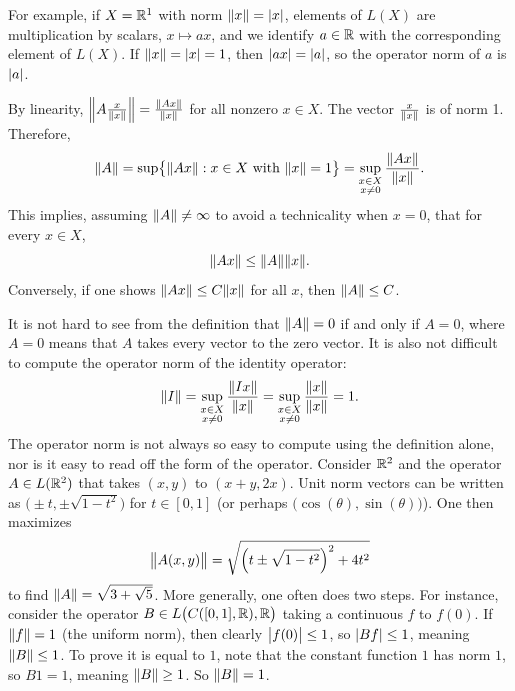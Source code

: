 For example, if $X={\mathbb{R}}^1$ with norm $\lVert {x} \rVert=\lvert {x} \rvert$, elements of $L(X)$
are multiplication by scalars, $x \mapsto ax$, and we identify $a \in {\mathbb{R}}$ with the
corresponding element of $L(X)$.  If $\lVert {x} \rVert=\lvert {x} \rvert=1$, then $\lvert {a x} \rvert = \lvert {a} \rvert$, so
the operator norm of $a$ is $\lvert {a} \rvert$.

By linearity,
$\left\lVert {A \frac{x}{\lVert {x} \rVert}} \right\rVert = \frac{\lVert {Ax} \rVert}{\lVert {x} \rVert}$
for all nonzero $x \in X$.
The vector $\frac{x}{\lVert {x} \rVert}$ is of norm 1.
Therefore,
\begin{equation*}
\lVert {A} \rVert =
\sup \bigl\{ \lVert {Ax} \rVert : x \in X \text{ with } \lVert {x} \rVert = 1 \bigr\}
=
\sup_{\substack{x \in X\\x\neq 0}} \frac{\lVert {Ax} \rVert}{\lVert {x} \rVert} .
\end{equation*}
This implies, assuming $\lVert {A} \rVert \neq \infty$ to avoid a technicality when $x=0$,
that for every $x \in X$,
\begin{equation*}
\snorm{Ax} \leq \snorm{A}  \snorm{x} .
\avoidbreak
\end{equation*}
Conversely, if one shows $\lVert {Ax} \rVert \leq C \lVert {x} \rVert$ for all $x$,
then $\lVert {A} \rVert \leq C$.

It is not hard to see from the definition that $\lVert {A} \rVert = 0$ if and
only if $A = 0$, where $A=0$ means that $A$ takes every vector to the zero vector.
It is also not difficult to compute the operator norm of the identity operator:
\begin{equation*}
\lVert {I} \rVert =
\sup_{\substack{x \in X\\x\neq 0}} \frac{\lVert {Ix} \rVert}{\lVert {x} \rVert} 
=
\sup_{\substack{x \in X\\x\neq 0}} \frac{\lVert {x} \rVert}{\lVert {x} \rVert} 
= 1.
\end{equation*}
The operator norm is not always so easy to compute using the definition
alone, nor is it easy to read off the form of the operator.
Consider ${\mathbb{R}}^2$ and the operator $A \in L({\mathbb{R}}^2)$ that takes
$(x,y)$ to $(x+y,2x)$.  
Unit norm vectors can be written as
$\bigl(\pm t, \pm \sqrt{1-t^2}\bigr)$
for $t \in [0,1]$
(or perhaps $\bigl(\cos(\theta), \sin(\theta) \bigr)$).
One then maximizes
\begin{equation*}
\bigl\lVert {A(x,y)} \bigr\rVert = \sqrt{{\left(t \pm \sqrt{1-t^2}\right)}^2+4t^2}
\end{equation*}
to find $\lVert {A} \rVert = \sqrt{3+\sqrt{5}}$.
More generally, one often does two steps.  For instance, consider
the operator
$B \in L\bigl(C([0,1],{\mathbb{R}}),{\mathbb{R}}\bigr)$
taking a continuous $f$ to $f(0)$.  If $\lVert {f} \rVert = 1$ (the uniform norm),
then clearly $\bigl\lvert {f(0)} \bigr\rvert \leq 1$, so $\lvert {Bf} \rvert \leq 1$, meaning
$\lVert {B} \rVert \leq 1$.
To prove it is equal to $1$, note that the constant function $1$ has
norm $1$, so $B1 = 1$, meaning $\lVert {B} \rVert \geq 1$.
So $\lVert {B} \rVert=1$.

